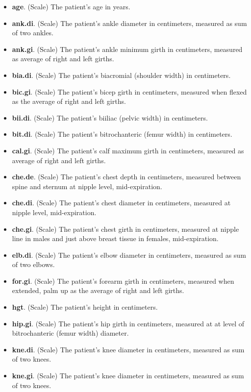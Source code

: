 \begin{itemize}
  \item \textbf{age}. (Scale) The patient's age in years.  
  \item \textbf{ank.di}. (Scale) The patient's ankle diameter in centimeters, measured as sum of two ankles.
  \item \textbf{ank.gi}. (Scale) The patient's ankle minimum girth in centimeters, measured as average of right and left girths.  
  \item \textbf{bia.di}. (Scale) The patient's biacromial (shoulder width) in centimeters.
  \item \textbf{bic.gi}. (Scale) The patient's bicep girth in centimeters, measured when flexed as the average of right and left girths.
  \item \textbf{bii.di}. (Scale) The patient's biiliac (pelvic width) in centimeters.
  \item \textbf{bit.di}. (Scale) The patient's bitrochanteric (femur width) in centimeters.
  \item \textbf{cal.gi}. (Scale) The patient's calf maximum girth in centimeters, measured as average of right and left girths.  
  \item \textbf{che.de}. (Scale) The patient's chest depth in centimeters, measured between spine and sternum at nipple level, mid-expiration.
  \item \textbf{che.di}. (Scale) The patient's chest diameter in centimeters, measured at nipple level, mid-expiration.
  \item \textbf{che.gi}. (Scale) The patient's chest girth in centimeters, measured at nipple line in males and just above breast tissue in females, mid-expiration.
  \item \textbf{elb.di}. (Scale) The patient's elbow diameter in centimeters, measured as sum of two elbows.
  \item \textbf{for.gi}. (Scale) The patient's forearm girth in centimeters, measured when extended, palm up as the average of right and left girths.
  \item \textbf{hgt}. (Scale) The patient's height in centimeters.
  \item \textbf{hip.gi}. (Scale) The patient's hip girth in centimeters, measured at at level of bitrochanteric (femur width) diameter.
  \item \textbf{kne.di}. (Scale) The patient's knee diameter in centimeters, measured as sum of two knees.
  \item \textbf{kne.gi}. (Scale) The patient's knee diameter in centimeters, measured as sum of two knees.

\end{itemize}
